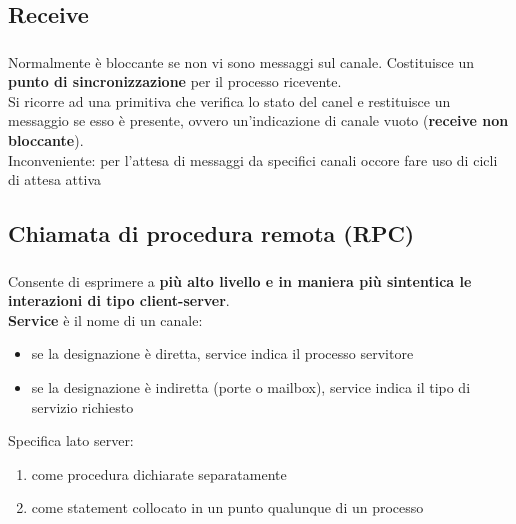 \documentclass{beamer}
\newenvironment{mainframe}{
	\begin{frame}
		\frametitle{\insertsubsection}
		\framesubtitle{\insertsection}
	}{
	\end{frame}
}
\begin{document}
\subsection{Receive}
\begin{mainframe}
	Normalmente è bloccante se non vi sono messaggi sul canale. Costituisce un \textbf{punto di sincronizzazione} per il processo ricevente.\\
	Si ricorre ad una primitiva che verifica lo stato del canel e restituisce un messaggio se esso è presente, ovvero un'indicazione di canale vuoto (\textbf{receive non bloccante}).\\
	Inconveniente: per l'attesa di messaggi da specifici canali occore fare uso di cicli di attesa attiva
\end{mainframe}
\subsection{Chiamata di procedura remota (RPC)}
\begin{mainframe}
	Consente di esprimere a \textbf{più alto livello e in maniera più sintentica le interazioni di tipo client-server}.\\
	\textbf{Service} è il nome di un canale:
	\begin{itemize}
		\item se la designazione è diretta, service indica il processo servitore
		\item se la designazione è indiretta (porte o mailbox), service indica il tipo di servizio richiesto
	\end{itemize}
	Specifica lato server:
	\begin{enumerate}
		\item come procedura dichiarate separatamente
		\item come statement collocato in un punto qualunque di un processo
	\end{enumerate}
\end{mainframe}
\end{document}
